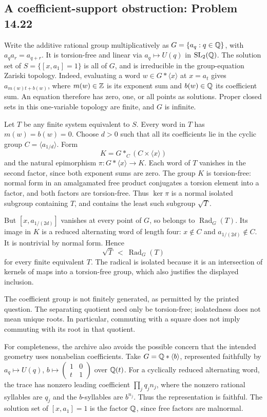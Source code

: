 \subsection{A coefficient-support obstruction: Problem 14.22}
\label{cand:14.22}

Write the additive rational group multiplicatively as
\(G=\{a_q:q\in\mathbb Q\}\), with \(a_qa_r=a_{q+r}\).
It is torsion-free and linear via \(a_q\mapsto U(q)\)
in \(\operatorname{SL}_2(\mathbb Q)\). The solution set of
\(S=\{[x,a_1]=1\}\) is all of \(G\), and is irreducible
in the group-equation Zariski topology. Indeed, evaluating
a word \(w\in G*\langle x\rangle\) at \(x=a_t\)
gives \(a_{m(w)t+b(w)}\), where \(m(w)\in\mathbb Z\)
is its exponent sum and \(b(w)\in\mathbb Q\) its coefficient sum.
An equation therefore has zero, one, or all points as
solutions. Proper closed sets in this one-variable topology
are finite, and \(G\) is infinite.

Let \(T\) be any finite system equivalent to \(S\).
Every word in \(T\) has \(m(w)=b(w)=0\). Choose \(d>0\)
such that all its coefficients lie in the cyclic group
\(C=\langle a_{1/d}\rangle\). Form
\[
 K=G*_C(C\times\langle x\rangle)
\]
and the natural epimorphism
\(\pi:G*\langle x\rangle\to K\).
Each word of \(T\) vanishes in the second factor, since
both exponent sums are zero. The group \(K\) is torsion-free:
normal form in an amalgamated free product conjugates a
torsion element into a factor, and both factors are
torsion-free. Thus \(\ker\pi\) is a normal isolated
subgroup containing \(T\), and contains the least such
subgroup \(\sqrt T\).

But \([x,a_{1/(2d)}]\) vanishes at every point of \(G\),
so belongs to \(\operatorname{Rad}_G(T)\). Its image in
\(K\) is a reduced alternating word of length four:
\(x\notin C\) and \(a_{1/(2d)}\notin C\). It is nontrivial
by normal form. Hence
\[
 \sqrt T\ <\ \operatorname{Rad}_G(T)
\]
for every finite equivalent \(T\). The radical is isolated
because it is an intersection of kernels of maps into a
torsion-free group, which also justifies the displayed
inclusion.

The coefficient group is not finitely generated, as permitted
by the printed question. The separating quotient need only
be torsion-free; isolatedness does not mean unique roots.
In particular, commuting with a square does not imply
commuting with its root in that quotient.

For completeness, the archive also avoids the possible concern
that the intended geometry uses nonabelian coefficients.
Take \(G=\mathbb Q*\langle b\rangle\), represented faithfully by
\(a_q\mapsto U(q)\), \(b\mapsto
\left(\begin{smallmatrix}1&0\\t&1\end{smallmatrix}\right)\)
over \(\mathbb Q(t)\). For a cyclically reduced alternating word,
the trace has nonzero leading coefficient
\(\prod_j q_j n_j\), where the nonzero rational syllables
are \(q_j\) and the \(b\)-syllables are \(b^{n_j}\).
Thus the representation is faithful. The solution set of
\([x,a_1]=1\) is the factor \(\mathbb Q\), since free factors are
malnormal.

